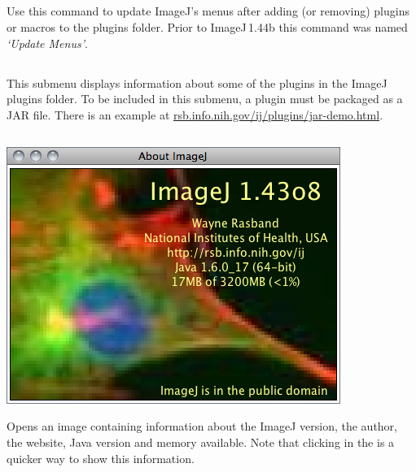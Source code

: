 \subsection{\protect{}\label{sub:Update-Menus}}

Use this command to update ImageJ's menus after adding
(or removing) plugins or macros to the plugins folder. Prior to ImageJ\,1.44b
this command was named \emph{`Update Menus'}.


\subsection{\protect{}\label{sub:About-Plugins}}

This submenu displays information about some of the plugins in the
ImageJ plugins folder. To be included in this submenu, a plugin must
be packaged as a JAR file. There is an example at \href{http://imagej.nih.gov/ij/plugins/jar-demo.html}{rsb.info.nih.gov/ij/plugins/jar-demo.html}. 


\subsection{\protect{}\label{sub:About-ImageJ...}}

\begin{minipage}[c][1\totalheight][t]{0.556\columnwidth}%
\includegraphics[scale=0.55]{images/AboutImageJ}%
\end{minipage}%
\begin{minipage}[c][1\totalheight][t]{0.444\columnwidth}%
Opens an image containing information about the ImageJ version, the
author, the website, Java version and memory available. Note that
clicking in the  is a quicker way to show
this information.


%
\end{minipage}
